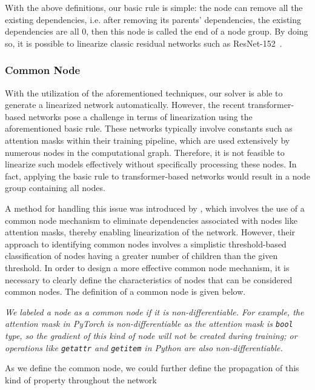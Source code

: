With the above definitions, our basic rule is simple: the node can remove all the existing dependencies, i.e. after removing its parents' dependencies, the existing dependencies are all 0, then this node is called the end of a node group. By doing so, it is possible to linearize classic residual networks such as ResNet-152~\cite{he2016deep}.

\subsubsection{Common Node}\label{common_node}

With the utilization of the aforementioned techniques, our solver is able to generate a linearized network automatically. However, the recent transformer-based networks pose a challenge in terms of linearization using the aforementioned basic rule. These networks typically involve constants such as attention masks within their training pipeline, which are used extensively by numerous nodes in the computational graph. Therefore, it is not feasible to linearize such models effectively without specifically processing these nodes. In fact, applying the basic rule to transformer-based networks would result in a node group containing all nodes.

A method for handling this issue was introduced by \cite{lai2022merak}, which involves the use of a common node mechanism to eliminate dependencies associated with nodes like attention masks, thereby enabling linearization of the network. However, their approach to identifying common nodes involves a simplistic threshold-based classification of nodes having a greater number of children than the given threshold. In order to design a more effective common node mechanism, it is necessary to clearly define the characteristics of nodes that can be considered common nodes. The definition of a common node is given below.

\begin{definition}
    \textit{We labeled a node as a common node if it is non-differentiable. For example, the attention mask in PyTorch is non-differentiable as the attention mask is \texttt{bool} type, so the gradient of this kind of node will not be created during training; or operations like \texttt{getattr} and \texttt{getitem} in Python are also non-differentiable.}
    \label{def: common-node}
\end{definition}

As we define the common node, we could further define the propagation of this kind of property throughout the network


